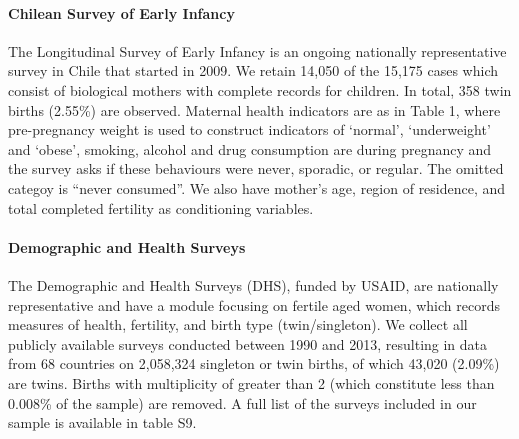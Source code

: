 \documentclass[12pt]{article}
\begin{document}
\paragraph{Chilean Survey of Early Infancy}

The Longitudinal Survey of Early Infancy is an ongoing nationally representative survey in Chile that started in 2009.  We retain 14,050 of the 15,175 cases which consist of biological mothers with complete records for children. In total, 358 twin births (2.55\%) are observed. Maternal health indicators are as in Table 1, where pre-pregnancy weight is used to construct indicators of  `normal', `underweight' and `obese', smoking, alcohol and drug consumption are during pregnancy and the survey asks if these behaviours were never, sporadic, or regular. The omitted categoy is ``never consumed''. We also have mother's age, region of residence, and total completed fertility as conditioning variables. 

\paragraph{Demographic and Health Surveys}
The Demographic and Health Surveys (DHS), funded by USAID, are nationally representative and have a module focusing on fertile aged women, which records measures of health, fertility, and birth type (twin/singleton).  We collect all publicly available surveys conducted between 1990 and 2013, resulting in data from 68 countries on 2,058,324 singleton or twin births, of which 43,020 (2.09\%) are twins.  Births with multiplicity of greater than 2 (which constitute less than 0.008\% of the sample) are removed.  A full list of the surveys included in our sample is available in table S9.


\end{document}
